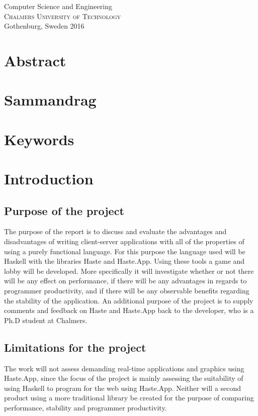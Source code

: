 \documentclass[a4paper]{article}
\begin{document}
\maketitle
{}
\vfill

\begin{center}
\large
Computer Science and Engineering\\
\textsc{Chalmers University of Technology} \\
Gothenburg, Sweden 2016 \\
\normalsize
\end{center}

\newpage
\section*{Abstract}
\section*{Sammandrag}
\section*{Keywords}
\newpage
\listoftodos
\tableofcontents
\listoffigures

\newpage
{}

\section{Introduction}
\subsection{Purpose of the project}
\label{sec:purpose}
The purpose of the report is to discuss and evaluate the advantages and disadvantages of writing client-server applications with all of the properties of using a purely functional language. For this purpose the language used will be Haskell with the libraries Haste and Haste.App. Using these tools a game and lobby will be developed. More specifically it will investigate whether or not there will be any effect on performance, if there will be any advantages in regards to programmer productivity, and if there will be any observable benefits regarding the stability of the application. An additional purpose of the project is to supply comments and feedback on Haste and Haste.App back to the developer, who is a Ph.D student at Chalmers.

\subsection{Limitations for the project}
The work will not assess demanding real-time applications and graphics using Haste.App, since the focus of the project is mainly assessing the suitability of using Haskell to program for the web using Haste.App. Neither will a second product using a more traditional library be created for the purpose of comparing performance, stability and programmer productivity.
\end{document}
